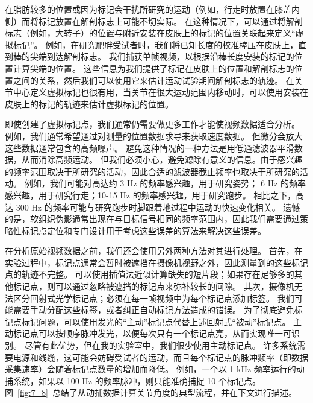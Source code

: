 在脂肪较多的位置或因为标记会干扰所研究的运动（例如，行走时放置在膝盖内侧）而将标记放置在解剖标志上可能不切实际。
在这种情况下，可以通过将解剖标志（例如，大转子）的位置与附近安装在皮肤上的标记的位置关联起来定义“虚拟标记”。
例如，在研究肥胖受试者时，我们将已知长度的校准棒压在皮肤上，直到棒的尖端到达解剖标志。
我们捕获单帧视频，以根据沿棒长度安装的标记的位置计算尖端的位置。
这些信息为我们提供了标记在皮肤上的位置和解剖标志的位置之间的关系，然后我们可以使用它来估计运动试验期间解剖标志的轨迹。
在关节中心定义虚拟标记也很有用，当关节在很大运动范围内移动时，可以使用安装在皮肤上的标记的轨迹来估计虚拟标记的位置。


即使创建了虚拟标记点，我们通常仍需要做更多工作才能使视频数据适合分析。
例如，我们通常希望通过对测量的位置数据求导来获取速度数据。
但微分会放大这些数据通常包含的高频噪声。
避免这种情况的一种方法是用低通滤波器平滑数据，从而消除高频运动。
但我们必须小心，避免滤除有意义的信息。由于感兴趣的频率范围取决于所研究的活动，因此合适的滤波器截止频率也取决于所研究的活动。
例如，我们可能对高达约 3 Hz 的频率感兴趣，用于研究姿势；
6 Hz 的频率感兴趣，用于研究行走；10-15 Hz 的频率感兴趣，用于研究跑步。
相比之下，高达 300 Hz 的频率可能与研究跑步时脚跟着地过程中运动的快速变化相关。
遗憾的是，软组织伪影通常出现在与目标信号相同的频率范围内，因此我们需要通过策略性标记点定位和专门设计用于考虑这些误差的算法来解决这些误差。


在分析原始视频数据之前，我们还会使用另外两种方法对其进行处理。
首先，在实验过程中，标记点通常会暂时被遮挡在摄像机视野之外，因此测量到的这些标记点的轨迹不完整。
可以使用插值法近似计算缺失的短片段；如果存在足够多的其他标记点，则可以通过忽略被遮挡的标记点来弥补较长的间隙。
其次，摄像机无法区分回射式光学标记点；必须在每一帧视频中为每个标记点添加标签。
我们可能需要手动分配这些标签，或者纠正自动标记方法造成的错误。
为了彻底避免标记点标记问题，可以使用发光的“主动”标记点代替上述回射式“被动”标记点。
主动标记点可以按顺序脉冲发光，以便每次只有一个标记点​​亮，从而实现唯一可识别。
尽管有此优势，但在我的实验室中，我们很少使用主动标记点。
许多系统需要电源和线缆，这可能会妨碍受试者的运动，而且每个标记点的脉冲频率（即数据采集速率）会随着标记点数量的增加而降低。
例如，一个以 1 kHz 频率运行的动捕系统，如果以 100 Hz 的频率脉冲，则只能准确捕捉 10 个标记点。
图~\ref{fig:7_8}~总结了从动捕数据计算关节角度的典型流程，并在下文进行描述。


